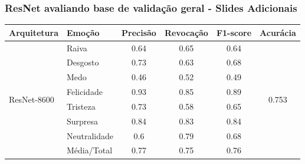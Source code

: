 \documentclass{beamer}
\begin{document}
\begin{frame}
  \frametitle{ResNet avaliando base de validação geral - Slides Adicionais}
\begin{table}[]
\tiny
  \centering
\label{my-label}
\begin{tabular}{llcccc}
\hline
\textbf{Arquitetura}                     & \textbf{Emoção}       & \multicolumn{1}{l}{\textbf{Precisão}} & \multicolumn{1}{l}{\textbf{Revocação}} & \multicolumn{1}{l}{\textbf{F1-score}} & \multicolumn{1}{l}{\textbf{Acurácia}} \\ \hline
\multirow{8}{*}{ResNet-8600}           & Raiva                 & 0.64                                  & 0.65                                   & 0.64                                  & \multirow{8}{*}{0.753}                \\
                                         & Desgosto              & 0.73                                  & 0.63                                   & 0.68                                  &                                       \\
                                         & Medo                  & 0.46                                  & 0.52                                   & 0.49                                  &                                       \\
                                         & Felicidade            & 0.93                                  & 0.85                                   & 0.89                                  &                                       \\
                                         & Tristeza              & 0.73                                  & 0.58                                   & 0.65                                  &                                       \\
                                         & Surpresa              & 0.84                                  & 0.83                                   & 0.84                                  &                                       \\
                                         & Neutralidade          & 0.6                                   & 0.79                                   & 0.68                                  &                                       \\
                                         & Média/Total           & 0.77                                  & 0.75                                   & 0.76                                  &                                       \\ \hline

\end{tabular}
\end{table}
\end{frame}
\end{document}
